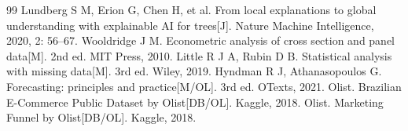 \documentclass[UTF8,12pt,a4paper]{ctexart}
\begin{document}
\begin{thebibliography}{99}
 Lundberg S M, Erion G, Chen H, et al. From local explanations to global understanding with explainable AI for trees[J]. Nature Machine Intelligence, 2020, 2: 56--67.
 Wooldridge J M. Econometric analysis of cross section and panel data[M]. 2nd ed. MIT Press, 2010.
 Little R J A, Rubin D B. Statistical analysis with missing data[M]. 3rd ed. Wiley, 2019.
 Hyndman R J, Athanasopoulos G. Forecasting: principles and practice[M/OL]. 3rd ed. OTexts, 2021.
 Olist. Brazilian E-Commerce Public Dataset by Olist[DB/OL]. Kaggle, 2018.
 Olist. Marketing Funnel by Olist[DB/OL]. Kaggle, 2018.
\end{thebibliography}
\end{document}

